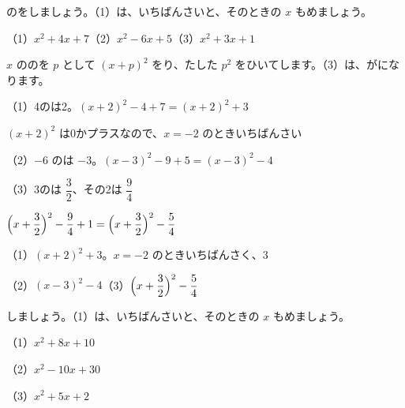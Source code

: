 \begin{reidai}
のをしましょう。（1）は、いちばんさいと、そのときの $x$ もめましょう。\par
（1）$x^2+4x+7$\qquad（2）$x^2-6x+5$\qquad（3）$x^2+3x+1$\par
\kangaekata $x$ ののを $p$ として $(x+p)^2$ をり、たした $p^2$ をひいてします。（3）は、がになります。\par
\shiki（1）\nobreak 4のは2。$(x+2)^2-4+7=(x+2)^2+3$\par
\hspace*{2.6\zw}\phantom{（1）}$(x+2)^2$ は0かプラスなので、$x=-2$ のときいちばんさい\par
\hspace*{2.6\zw}（2）\nobreak $-6$ のは $-3$。$(x-3)^2-9+5=(x-3)^2-4$\par
\vspace{5pt}%
\hspace*{2.6\zw}（3）\nobreak 3のは $\dfrac{3}{2}$、その2は $\dfrac{9}{4}$\par\vspace{6pt}
\hspace*{2.6\zw}\phantom{（3）}$\Bigl(x+\dfrac{3}{2}\Bigr)^2-\dfrac{9}{4}+1=\Bigl(x+\dfrac{3}{2}\Bigr)^2-\dfrac{5}{4}$\par\vspace{5pt}
\kotae（1）\nobreak $(x+2)^2+3$。$x=-2$ のときいちばんさく、3\par\vspace{3pt}
\hspace*{2.6\zw}（2）\nobreak $(x-3)^2-4$\qquad（3）\nobreak $\Bigl(x+\dfrac{3}{2}\Bigr)^2-\dfrac{5}{4}$
\end{reidai}

\begin{jibun}
しましょう。（1）は、いちばんさいと、そのときの $x$ もめましょう。\par
（1）$x^2+8x+10$\par
（2）$x^2-10x+30$\par
（3）$x^2+5x+2$
\end{jibun}

